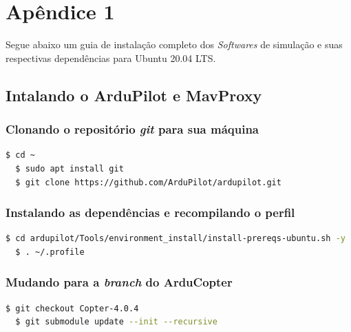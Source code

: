 \documentclass[12pt,a4paper,oneside]{book}
\begin{document}




%

%
%
\thispagestyle{myheadings}

%

%
%
%
%
\appendix
%
%
%
\chapter{Apêndice 1}
%
\thispagestyle{empty} 
%
Segue abaixo um guia de instalação completo dos \textit{Softwares} de simulação e suas respectivas dependências para Ubuntu 20.04 LTS.

\section{Intalando o ArduPilot e MavProxy}

\subsection{Clonando o repositório \textit{git} para sua máquina}
\begin{lstlisting}[language=bash]
  $ cd ~
  $ sudo apt install git
  $ git clone https://github.com/ArduPilot/ardupilot.git
\end{lstlisting}

\subsection{Instalando as dependências e recompilando o perfil}
\begin{lstlisting}[language=bash]
  $ cd ardupilot/Tools/environment_install/install-prereqs-ubuntu.sh -y
  $ . ~/.profile
\end{lstlisting}

\subsection{Mudando para a \textit{branch} do ArduCopter}
\begin{lstlisting}[language=bash]
  $ git checkout Copter-4.0.4
  $ git submodule update --init --recursive
\end{lstlisting}
\end{document}
